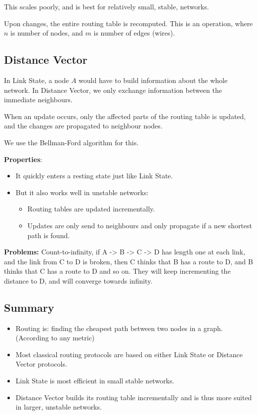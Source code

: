 	This scales poorly, and is best for relatively small, stable, networks.
	
	Upon changes, the entire routing table is recomputed. This is an  operation, where $n$ is number of nodes, and $m$ is number of edges (wires).
	
	\subsection{Distance Vector}
	In Link State, a node $A$ would have to build information about the whole network. In Distance Vector, we only exchange information between the immediate neighbours.
	
	When an update occurs, only the affected parts of the routing table is updated, and the changes are propagated to neighbour nodes.
	
	We use the Bellman-Ford algorithm for this.
	
	\textbf{Properties}:
	\begin{itemize}
		\item It quickly enters a resting state just like Link State.
		\item But it also works well in unstable networks:
		\begin{itemize}
			\item Routing tables are updated incrementally.
			\item Updates are only send to neighbours and only propagate if a new shortest path is found.
		\end{itemize}
	\end{itemize}
	
	\textbf{Problems:} Count-to-infinity, if A -> B -> C -> D has length one at each link, and the link from C to D is broken, then C thinks that B has a route to D, and B thinks that C has a route to D and so on. They will keep incrementing the distance to D, and will converge towards infinity.
	
	\subsection{Summary}
	\begin{itemize}
		\item Routing is: finding the cheapest path between two nodes in a graph. (According to any metric)
		\item Most classical routing protocols are based on either Link State or Distance Vector protocols.
		\item Link State is most efficient in small stable networks.
		\item Distance Vector builds its routing table incrementally and is thus more suited in larger, unstable networks.
	\end{itemize}
	
